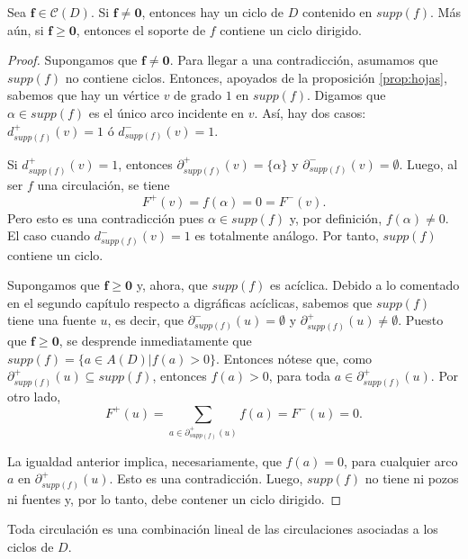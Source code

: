 \begin{lema} \label{lema:circulacion}
Sea $\mathbf{f} \in \mathcal{C}(D)$. Si $\mathbf{f} \neq \mathbf{0}$, entonces hay un ciclo de $D$ contenido en $supp(f)$. Más aún, si $\mathbf{f} \geq \mathbf{0}$, entonces el soporte de $f$ contiene un ciclo dirigido.
\end{lema}

\begin{proof}
Supongamos que $\mathbf{f} \neq \mathbf{0}$. Para llegar a una contradicción, asumamos que $supp(f)$ no contiene ciclos. Entonces, apoyados de la proposición \ref{prop:hojas}, sabemos que hay un vértice $v$ de grado $1$ en $supp(f)$. Digamos que $\alpha \in supp(f)$ es el único arco incidente en $v$. Así, hay dos casos: $d_{supp(f)}^{+}(v) = 1$ ó $d_{supp(f)}^{-}(v)=1$.

Si $d_{supp(f)}^{+}(v) = 1$, entonces $\partial_{supp(f)}^{+}(v) = \{\alpha\}$ y $\partial_{supp(f)}^{-}(v) = \emptyset$. Luego, al ser $f$ una circulación, se tiene
$$
F^{+}(v) = f(\alpha) = 0 = F^{-}(v).
$$
Pero esto es una contradicción pues $\alpha \in supp(f)$ y, por definición, $f(\alpha) \neq 0$. El caso cuando $d_{supp(f)}^{-}(v)=1$ es totalmente análogo. Por tanto, $supp(f)$ contiene un ciclo.

Supongamos que $\mathbf{f} \geq \mathbf{0}$ y, ahora, que $supp(f)$ es acíclica. Debido a lo comentado en el segundo capítulo respecto a digráficas acíclicas, sabemos que $supp(f)$ tiene una fuente $u$, es decir, que $\partial_{supp(f)}^{-}(u)=\emptyset$ y $\partial_{supp(f)}^{+}(u) \neq \emptyset$. Puesto que $\mathbf{f} \geq \mathbf{0}$, se desprende inmediatamente que $supp(f) = \{a \in A(D) | f(a)>0 \}$. Entonces nótese que, como $ \partial_{supp(f)}^{+}(u) \subseteq supp(f)$, entonces $f(a) > 0$, para toda $a \in \partial_{supp(f)}^{+}(u)$. Por otro lado, 
$$
F^{+}(u)= \sum_{a \in \partial_{supp(f)}^{+}(u)} f(a)= F^{-}(u) = 0.
$$

La igualdad anterior implica, necesariamente, que $f(a) = 0$, para cualquier arco $a$ en $\partial_{supp(f)}^{+}(u)$. Esto es una contradicción. Luego, $supp(f)$ no tiene ni pozos ni fuentes y, por lo tanto, debe contener un ciclo dirigido.

\end{proof}

\begin{teo}
Toda circulación es una combinación lineal de las circulaciones asociadas a los ciclos de $D$.
\end{teo}

